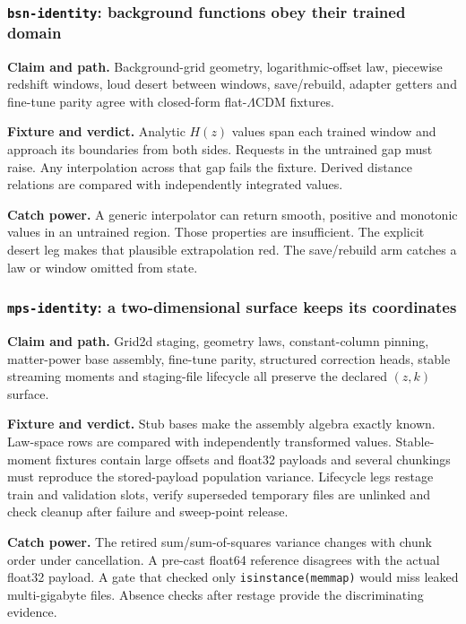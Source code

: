 \documentclass[10pt,aps,prd,twocolumn,nofootinbib]{revtex4-2}
\newcommand{\code}[1]{\texttt{#1}}
\begin{document}
\subsubsection{\code{bsn-identity}: background functions obey their trained domain}

\textbf{Claim and path.}  Background-grid geometry, logarithmic-offset law,
piecewise redshift windows, loud desert between windows, save/rebuild, adapter
getters and fine-tune parity agree with closed-form flat-\(\Lambda\)CDM
fixtures.

\textbf{Fixture and verdict.}  Analytic \(H(z)\) values span each trained
window and approach its boundaries from both sides.  Requests in the
untrained gap must raise.  Any interpolation across that gap fails the
fixture.  Derived distance relations are compared with independently integrated values.

\textbf{Catch power.}  A generic interpolator can return smooth, positive and
monotonic values in an untrained region.  Those properties are insufficient.
The explicit desert leg makes that plausible extrapolation red.  The
save/rebuild arm catches a law or window omitted from state.

\subsubsection{\code{mps-identity}: a two-dimensional surface keeps its coordinates}

\textbf{Claim and path.}  Grid2d staging, geometry laws, constant-column
pinning, matter-power base assembly, fine-tune parity, structured correction
heads, stable streaming moments and staging-file lifecycle all preserve the
declared \((z,k)\) surface.

\textbf{Fixture and verdict.}  Stub bases make the assembly algebra exactly
known.  Law-space rows are compared with independently transformed values.
Stable-moment fixtures contain large offsets and float32 payloads and several
chunkings must reproduce the stored-payload population variance.  Lifecycle
legs restage train and validation slots, verify superseded temporary files are
unlinked and check cleanup after failure and sweep-point release.

\textbf{Catch power.}  The retired sum/sum-of-squares variance changes with
chunk order under cancellation.  A pre-cast float64 reference disagrees with
the actual float32 payload.  A gate that checked only
\code{isinstance(memmap)} would miss leaked multi-gigabyte files.  Absence
checks after restage provide the discriminating evidence.
\end{document}
